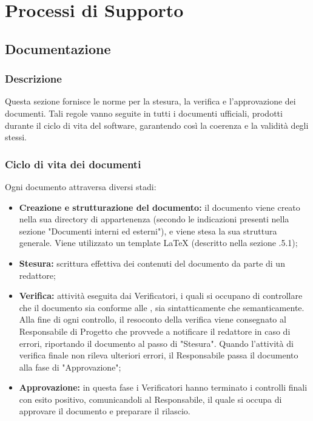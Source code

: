 \section{Processi di Supporto}
  \subsection{Documentazione}
    \subsubsection{Descrizione}
      Questa sezione fornisce le norme per la stesura, la verifica e l'approvazione dei documenti. Tali regole vanno seguite in tutti i documenti ufficiali, prodotti durante il ciclo di vita del software, garantendo così la coerenza e la validità degli stessi.

    \subsubsection{Ciclo di vita dei documenti}
      Ogni documento attraversa diversi stadi:
      \begin{itemize}
        \item \textbf{Creazione e strutturazione del documento:} il documento viene creato nella sua directory di appartenenza (secondo le indicazioni presenti nella sezione "Documenti interni ed esterni"), e viene stesa la sua struttura generale. Viene utilizzato un template \LaTeX{} (descritto nella sezione .5.1);
        \item \textbf{Stesura:} scrittura effettiva dei contenuti del documento da parte di un redattore;
        \item \textbf{Verifica:} attività eseguita dai Verificatori, i quali si occupano di controllare che il documento sia conforme alle \textit{\NdP{}}, sia sintatticamente che semanticamente. Alla fine di ogni controllo, il resoconto della verifica viene consegnato al Responsabile di Progetto che provvede a notificare il redattore in caso di errori, riportando il documento al passo di "Stesura". Quando l'attività di verifica finale non rileva ulteriori errori, il Responsabile passa il documento alla fase di "Approvazione";
        \item \textbf{Approvazione:} in questa fase i Verificatori hanno terminato i controlli finali con esito positivo, comunicandoli al Responsabile, il quale si occupa di approvare il documento e preparare il rilascio.
      \end{itemize}

